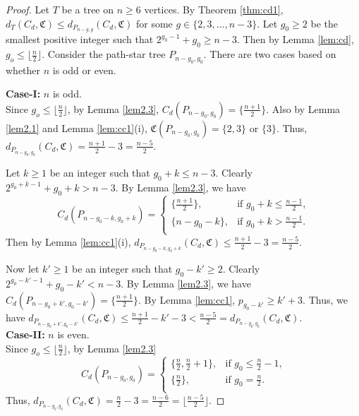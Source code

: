 \documentclass[11pt]{article}
\begin{document}
\begin{proof}
Let $T$ be a tree on $n\geq 6$ vertices. By Theorem \ref{thm:cd1}, $d_T(C_d,\mathfrak{C})\leq d_{P_{n-g,g}}(C_d,\mathfrak{C})$ for some $g\in \{2,3,\ldots,n-3\}$.  
Let $g_0\geq 2$ be the smallest positive integer such that $2^{g_0-1}+g_0\geq n-3$. Then by Lemma \ref{lem:cd}, $g_o\leq \lfloor \frac{n}{2} \rfloor$. Consider the path-star tree $P_{n-g_0,g_0}$. There are two cases based on whether $n$ is odd or even.

\textbf{Case-I:} $n$ is odd.\\
Since $g_o\leq \lfloor \frac{n}{2} \rfloor$, by Lemma \ref{lem2.3},  $C_d(P_{n-g_0,g_0})=\{\frac{n+1}{2}\}$. Also by Lemma \ref{lem2.1} and Lemma \ref{lem:cc1}(i), $\mathfrak{C}(P_{n-g_0,g_0})=\{2,3\}$ or $\{3\}$. Thus, $d_{P_{n - g_0, g_0}}(C_d,\mathfrak{C})= \frac{n+1}{2} - 3=\frac{n-5}{2}.$

Let $k\geq 1$ be an integer such that $g_0+k\leq n-3$. Clearly $2^{g_0+k-1}+g_0+k> n-3$. By Lemma \ref{lem2.3}, we have 
$$C_d(P_{n-g_0-k,g_0+k})=\left\{
\begin{array}{ll}
  \{\frac{n+1}{2}\},  &\text{if $g_0+k\leq \frac{n-1}{2}$,}\\
  \{n-g_0-k\}, &\text{if $g_0+k> \frac{n-1}{2}$.}\\
\end{array}
\right.$$ 
Then by Lemma \ref{lem:cc1}(i), $d_{P_{n - g_0-k, g_0+k}}(C_d,\mathfrak{C})\leq \frac{n+1}{2} - 3=\frac{n-5}{2}.$

Now let $k'\geq 1$ be an integer such that $g_0-k'\geq 2$. Clearly $2^{g_0-k'-1}+g_0-k'< n-3$. By Lemma \ref{lem2.3}, we have $C_d(P_{n-g_0+k',g_0-k'})=\{\frac{n+1}{2}\}$. By Lemma \ref{lem:cc1}, $ p_{g_0-k'}\geq k'+3$. Thus, we have $d_{P_{n - g_0+k', g_0-k'}}(C_d,\mathfrak{C})\leq \frac{n+1}{2}-k'-3<\frac{n-5}{2}=d_{P_{n - g_0, g_0}}(C_d,\mathfrak{C})$.\\

\textbf{Case-II:} $n$ is even.\\
Since $g_o\leq \lfloor \frac{n}{2} \rfloor$, by Lemma \ref{lem2.3}
$$C_d(P_{n-g_0,g_0})=\left\{
\begin{array}{ll}
  \{\frac{n}{2},\frac{n}{2}+1 \},  &\text{if $g_0\leq \frac{n}{2}-1$,}\\
  \{\frac{n}{2}\}, &\text{if $g_0 =\frac{n}{2}$.}\\
\end{array}
\right.$$ 
Thus, $d_{P_{n - g_0, g_0}}(C_d,\mathfrak{C})= \frac{n}{2} - 3=\frac{n-6}{2}=\lfloor \frac{n-5}{2} \rfloor.$


\end{proof}
\end{document}

